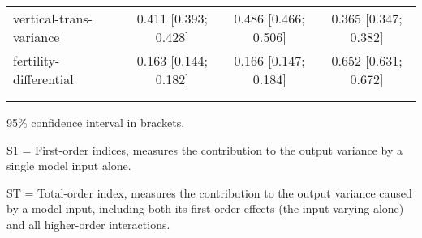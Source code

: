 \begin{table}[htp]
\begin{threeparttable}
\begin{tabular}{lccc}
	  \hspace{1.5em} vertical-trans-variance & 0.411 [0.393; 0.428]   & 0.486 [0.466; 0.506]   & 0.365 [0.347; 0.382] \\
	  \hspace{1.5em} fertility-differential & 0.163 [0.144; 0.182]   & 0.166 [0.147; 0.184]   & 0.652 [0.631; 0.672] \\
	 \\
\addlinespace
\hline
\end{tabular}
\begin{tablenotes}
\scriptsize
\item 95\% confidence interval in brackets.
\item S1 = First-order indices,  measures the contribution to the output variance by a single model input alone.
\item ST = Total-order index, measures the contribution to the output variance caused by a model input, including both its first-order effects (the input varying alone) and all higher-order interactions.
\end{tablenotes}
\end{threeparttable}
\end{table}